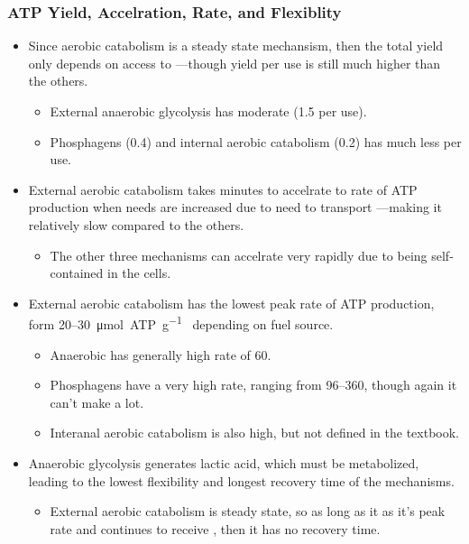 \documentclass[12pt,a4paper]{article}
\begin{document}
\begin{itemize}
    \subsubsection{ATP Yield, Accelration, Rate, and Flexiblity}
    \begin{itemize}
        \item Since aerobic catabolism is a steady state mechansism, then the total yield only depends on access to ---though yield per use is still much higher than the others.
            \begin{itemize}
                \item External anaerobic glycolysis has moderate (1.5 per use).
                \item Phosphagens (0.4) and internal aerobic catabolism (0.2) has much less per use.
            \end{itemize}
        \item External aerobic catabolism takes minutes to accelrate to rate of ATP production when needs are increased due to need to transport ---making it relatively slow compared to the others.
            \begin{itemize}
                \item The other three mechanisms can accelrate very rapidly due to being {\color{o-Sun}self-contained} in the cells.
            \end{itemize}
        \item External aerobic catabolism has the lowest peak rate of ATP production, form 20--\SI{30}{\micro\mole~ATP\per g.\min}  depending on fuel source.
            \begin{itemize}
                \item Anaerobic has generally high rate of 60.
                \item Phosphagens have a very high rate, ranging from 96--360, though again it can't make a lot.
                \item Interanal aerobic catabolism is also high, but not defined in the textbook.
            \end{itemize}
        \item Anaerobic glycolysis generates lactic acid, which must be metabolized, leading to the lowest flexibility and longest recovery time of the mechanisms.
            \begin{itemize}
                \item External aerobic catabolism is steady state, so as long as it as it's peak rate and continues to receive , then it has no recovery time.

\end{itemize}
\end{itemize}
\end{itemize}
\end{document}
